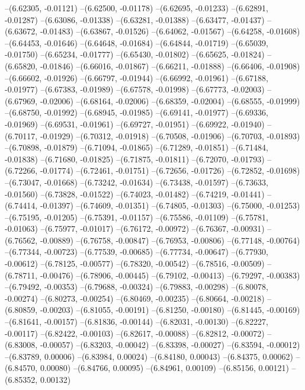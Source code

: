 --(6.62305, -0.01121)
--(6.62500, -0.01178)
--(6.62695, -0.01233)
--(6.62891, -0.01287)
--(6.63086, -0.01338)
--(6.63281, -0.01388)
--(6.63477, -0.01437)
--(6.63672, -0.01483)
--(6.63867, -0.01526)
--(6.64062, -0.01567)
--(6.64258, -0.01608)
--(6.64453, -0.01646)
--(6.64648, -0.01684)
--(6.64844, -0.01719)
--(6.65039, -0.01750)
--(6.65234, -0.01777)
--(6.65430, -0.01802)
--(6.65625, -0.01824)
--(6.65820, -0.01846)
--(6.66016, -0.01867)
--(6.66211, -0.01888)
--(6.66406, -0.01908)
--(6.66602, -0.01926)
--(6.66797, -0.01944)
--(6.66992, -0.01961)
--(6.67188, -0.01977)
--(6.67383, -0.01989)
--(6.67578, -0.01998)
--(6.67773, -0.02003)
--(6.67969, -0.02006)
--(6.68164, -0.02006)
--(6.68359, -0.02004)
--(6.68555, -0.01999)
--(6.68750, -0.01992)
--(6.68945, -0.01985)
--(6.69141, -0.01977)
--(6.69336, -0.01969)
--(6.69531, -0.01961)
--(6.69727, -0.01951)
--(6.69922, -0.01940)
--(6.70117, -0.01929)
--(6.70312, -0.01918)
--(6.70508, -0.01906)
--(6.70703, -0.01893)
--(6.70898, -0.01879)
--(6.71094, -0.01865)
--(6.71289, -0.01851)
--(6.71484, -0.01838)
--(6.71680, -0.01825)
--(6.71875, -0.01811)
--(6.72070, -0.01793)
--(6.72266, -0.01774)
--(6.72461, -0.01751)
--(6.72656, -0.01726)
--(6.72852, -0.01698)
--(6.73047, -0.01668)
--(6.73242, -0.01634)
--(6.73438, -0.01597)
--(6.73633, -0.01560)
--(6.73828, -0.01522)
--(6.74023, -0.01482)
--(6.74219, -0.01441)
--(6.74414, -0.01397)
--(6.74609, -0.01351)
--(6.74805, -0.01303)
--(6.75000, -0.01253)
--(6.75195, -0.01205)
--(6.75391, -0.01157)
--(6.75586, -0.01109)
--(6.75781, -0.01063)
--(6.75977, -0.01017)
--(6.76172, -0.00972)
--(6.76367, -0.00931)
--(6.76562, -0.00889)
--(6.76758, -0.00847)
--(6.76953, -0.00806)
--(6.77148, -0.00764)
--(6.77344, -0.00723)
--(6.77539, -0.00685)
--(6.77734, -0.00647)
--(6.77930, -0.00612)
--(6.78125, -0.00577)
--(6.78320, -0.00542)
--(6.78516, -0.00509)
--(6.78711, -0.00476)
--(6.78906, -0.00445)
--(6.79102, -0.00413)
--(6.79297, -0.00383)
--(6.79492, -0.00353)
--(6.79688, -0.00324)
--(6.79883, -0.00298)
--(6.80078, -0.00274)
--(6.80273, -0.00254)
--(6.80469, -0.00235)
--(6.80664, -0.00218)
--(6.80859, -0.00203)
--(6.81055, -0.00191)
--(6.81250, -0.00180)
--(6.81445, -0.00169)
--(6.81641, -0.00157)
--(6.81836, -0.00144)
--(6.82031, -0.00130)
--(6.82227, -0.00117)
--(6.82422, -0.00103)
--(6.82617, -0.00088)
--(6.82812, -0.00072)
--(6.83008, -0.00057)
--(6.83203, -0.00042)
--(6.83398, -0.00027)
--(6.83594, -0.00012)
--(6.83789, 0.00006)
--(6.83984, 0.00024)
--(6.84180, 0.00043)
--(6.84375, 0.00062)
--(6.84570, 0.00080)
--(6.84766, 0.00095)
--(6.84961, 0.00109)
--(6.85156, 0.00121)
--(6.85352, 0.00132)
